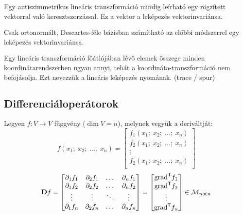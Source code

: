 \documentclass[main.tex]{subfiles}
\begin{document}
Egy antiszimmetrikus lineáris transzformáció
mindig leírható egy rögzített vektorral
való keresztszorzással. Ez a vektor a leképezés
vektorinvariánsa.



Csak ortonormált, Descartes-féle bázisban
számítható az előbbi módszerrel egy leképezés
vektorinvariánsa.



Egy lineáris transzformáció főátlójában lévő
elemek összege minden koordinátarendszerben
ugyan annyi, tehát a koordináta-transzformáció
nem befojásolja. Ezt nevezzük a lineáris
leképezés nyomának. (trace / spur)

\subsection{Differenciáloperátorok}

Legyen $f: V \rightarrow V$ függvény ($\dim V = n$),
melynek vegyük a deriváltját:
\begin{equation*}
  f \left( x_1; \; x_2; \; \dots ; \; x_n \right)
  =
  \begin{bmatrix}
    f_1 \left( x_1; \; x_2; \; \dots ; \; x_n \right) \\
    f_2 \left( x_1; \; x_2; \; \dots ; \; x_n \right) \\
    \vdots                                            \\
    f_2 \left( x_1; \; x_2; \; \dots ; \; x_n \right) \\
  \end{bmatrix}
\end{equation*}
\begin{equation*}
  \mathbf{D} f
  =
  \begin{bmatrix}
    \partial_1 f_1 & \partial_2 f_1 & \dots  & \partial_n f_1 \\
    \partial_1 f_2 & \partial_2 f_2 & \dots  & \partial_n f_2 \\
    \vdots         & \vdots         & \ddots & \vdots         \\
    \partial_1 f_n & \partial_2 f_n & \dots  & \partial_n f_n
  \end{bmatrix}
  =
  \begin{bmatrix}
    \mathrm{grad}^{\mathsf{T}} f_1 \\
    \mathrm{grad}^{\mathsf{T}} f_2 \\
    \vdots               \\
    \mathrm{grad}^{\mathsf{T}} f_n \\
  \end{bmatrix}
  \in
  \mathcal{M}_{n \cross n}
\end{equation*}
\end{document}
